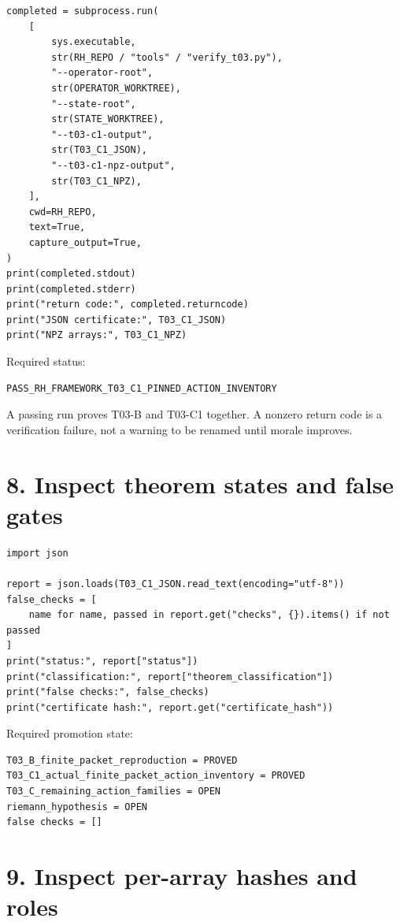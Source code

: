 \begin{verbatim}
completed = subprocess.run(
    [
        sys.executable,
        str(RH_REPO / "tools" / "verify_t03.py"),
        "--operator-root",
        str(OPERATOR_WORKTREE),
        "--state-root",
        str(STATE_WORKTREE),
        "--t03-c1-output",
        str(T03_C1_JSON),
        "--t03-c1-npz-output",
        str(T03_C1_NPZ),
    ],
    cwd=RH_REPO,
    text=True,
    capture_output=True,
)
print(completed.stdout)
print(completed.stderr)
print("return code:", completed.returncode)
print("JSON certificate:", T03_C1_JSON)
print("NPZ arrays:", T03_C1_NPZ)
\end{verbatim}

Required status:

\begin{verbatim}
PASS_RH_FRAMEWORK_T03_C1_PINNED_ACTION_INVENTORY
\end{verbatim}

A passing run proves T03-B and T03-C1 together. A nonzero return code is a
verification failure, not a warning to be renamed until morale improves.

\hypertarget{inspect-theorem-states-and-false-gates}{%
\section{8. Inspect theorem states and false gates}\label{inspect-theorem-states-and-false-gates}}

\begin{verbatim}
import json

report = json.loads(T03_C1_JSON.read_text(encoding="utf-8"))
false_checks = [
    name for name, passed in report.get("checks", {}).items() if not passed
]
print("status:", report["status"])
print("classification:", report["theorem_classification"])
print("false checks:", false_checks)
print("certificate hash:", report.get("certificate_hash"))
\end{verbatim}

Required promotion state:

\begin{verbatim}
T03_B_finite_packet_reproduction = PROVED
T03_C1_actual_finite_packet_action_inventory = PROVED
T03_C_remaining_action_families = OPEN
riemann_hypothesis = OPEN
false checks = []
\end{verbatim}

\hypertarget{inspect-per-array-hashes-and-roles}{%
\section{9. Inspect per-array hashes and roles}\label{inspect-per-array-hashes-and-roles}}

